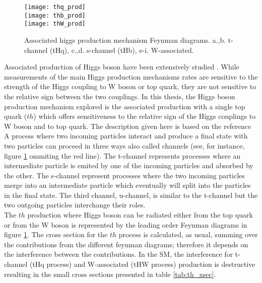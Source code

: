 \begin{figure}[h!]
\centering
\texttt{[image: thq\_prod]}\\
\texttt{[image: thb\_prod]}\\
\texttt{[image: thW\_prod]}\\
\caption[Associated Higgs production mechanism Feynman diagrams]{Associated higgs production mechanism Feynman diagrams. a.,b. t-channel (tHq), c.,d. s-channel (tHb), e-i. W-associated.}
\label{th_prod}
\end{figure}

\noindent \noindent Associated production of Higgs boson have been extensively studied \cite{maltoni1, biswas, farina,tait, maltoni2}. While measurements of the main Higgs production mechanisms rates are sensitive to the strength of the Higgs coupling to W boson or top quark, they are not sensitive to the relative sign between the two couplings. In this thesis, the Higgs boson production mechanism explored is the associated production with a single top quark ($th$) which offers sensitiveness to the relative sign of the Higgs couplings to W boson and to top quark. The description given here is based on the reference \cite{farina}\\

\noindent A process where two incoming particles interact and produce a final state with two particles can proceed in three ways also called channels (see, for instance, figure \ref{th_prod} ommiting the red line). The t-channel represents processes where an intermediate particle is emited by one of the incoming particles and absorbed by the other. The s-channel represent processes where the two incoming particles merge into an intermediate particle which eventually will split into the particles in the final state. The third channel, u-channel, is similar to the t-channel but the two outgoing particles interchange their roles.\\

\noindent The $th$ production where Higgs boson can be radiated either from the top quark or from the W boson is represented by the leading order Feynman diagrams in figure \ref{th_prod}. The cross section for the $th$ process is calculated, as usual, summing over the contributions from the different feynman diagrams; therefore it depends on the interference between the contributions. In the SM, the interference for t-channel (tHq process)  and W-associated (tHW process) production is destructive \cite{maltoni1} resulting in the small cross sections presented in table \ref{tab:th_xsec}. 

